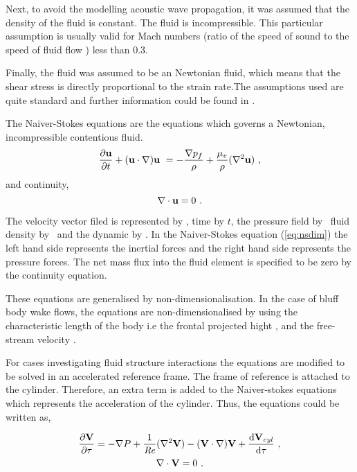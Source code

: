  
 Next, to avoid the modelling acoustic wave propagation, it was assumed that the density of the fluid is constant. The fluid is incompressible. This particular assumption is usually valid for Mach numbers (ratio of the speed of sound to the speed of fluid flow ) less than 0.3.
 
 Finally, the fluid was assumed to be an Newtonian fluid, which means that the shear stress is directly proportional to the strain rate.The assumptions used are quite standard and further information could be found in \citet{White99}.        

The Naiver-Stokes equations are the equations which governs a Newtonian, incompressible contentious fluid.
  \begin{equation} \centering
  \label{eq:nsdim}
  \pderiv{\vecu}{t} + (\vecu\cdot\nabla)\vecu\ = -\frac{\grad{\pres}}{\density} + \frac{\dynvis}{\density}(\gradsq{\vecu})~,
  \end{equation}
  and continuity,
  \begin{equation} \centering
  \divergence{\vecu} = 0~.
  \end{equation}
  
  The velocity vector filed is represented by \vecu, time by $t$, the pressure field by \pres \ fluid density by \density \ and the dynamic  by \dynvis. In the Naiver-Stokes equation (\ref{eq:nsdim}) the left hand side represents the inertial forces and the right hand side represents the pressure forces. The net mass flux into the fluid element is specified to be zero by the continuity equation. 
  
  These equations are generalised by non-dimensionalisation. In the case of bluff body wake flows, the equations are non-dimensionalised by using the characteristic length of the body i.e the frontal projected hight \diam, and the free-stream velocity \Ufree. 
  
  For cases investigating fluid structure interactions the equations are modified  to  be solved in an accelerated reference frame. The frame of reference is attached to the cylinder. Therefore, an extra term is added to the Naiver-stokes equations which represents the acceleration of the cylinder. Thus, the equations could be written as, 
  
  \begin{equation} \centering
  \label{eq:nsfinal}
  \pderiv{\vecV}{\tau} = -\grad{\Pres} + \frac{1}{\Rey}(\gradsq{\vecV}) - (\vecV\cdot\nabla)\vecV + \accframe ~,
  \end{equation}
  \begin{equation}
  \label{eq:continuity}
  \nabla\cdot\mathbf{V} = 0~.
  \end{equation}
  
